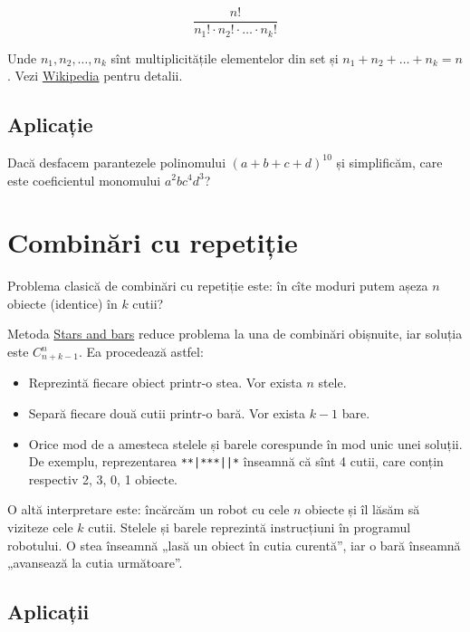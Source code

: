 \documentclass[../main.tex]{subfiles}
\begin{document}
$$\frac{n!}{n_1! \cdot n_2! \cdot \dots \cdot n_k!}$$

Unde $n_1, n_2, \dots, n_k$ sînt multiplicitățile elementelor din set și $n_1 + n_2 + \dots + n_k = n$. Vezi \href{https://en.wikipedia.org/wiki/Permutation#Permutations_of_multisets}{Wikipedia} pentru detalii.

\subsection{Aplicație}

Dacă desfacem parantezele polinomului $(a + b + c + d)^{10}$ și simplificăm, care este coeficientul monomului $a^2bc^4d^3$?

\section{Combinări cu repetiție}

Problema clasică de combinări cu repetiție este: în cîte moduri putem așeza $n$ obiecte (identice) în $k$ cutii?

Metoda \href{https://en.wikipedia.org/wiki/Stars\_and\_bars\_(combinatorics)}{Stars and bars} reduce problema la una de combinări obișnuite, iar soluția este $C_{n + k - 1}^{n}$. Ea procedează astfel:

\begin{itemize}
  \item Reprezintă fiecare obiect printr-o stea. Vor exista $n$ stele.
  \item Separă fiecare două cutii printr-o bară. Vor exista $k - 1$ bare.
  \item Orice mod de a amesteca stelele și barele corespunde în mod unic unei soluții. De exemplu, reprezentarea \texttt{**|***||*} înseamnă că sînt 4 cutii, care conțin respectiv 2, 3, 0, 1 obiecte.
\end{itemize}

O altă interpretare este: încărcăm un robot cu cele $n$ obiecte și îl lăsăm să viziteze cele $k$ cutii. Stelele și barele reprezintă instrucțiuni în programul robotului. O stea înseamnă „lasă un obiect în cutia curentă”, iar o bară înseamnă „avansează la cutia următoare”.

\subsection{Aplicații}
\end{document}
